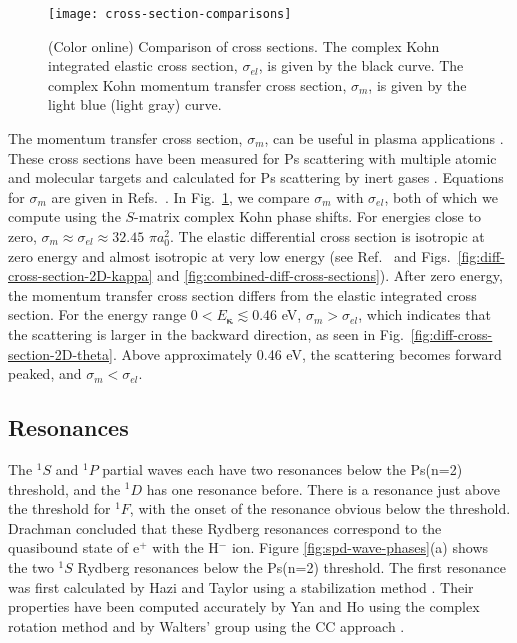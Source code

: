 \documentclass[preprint,showpacs,showkeys,preprintnumbers,amsmath,amssymb,longbibliography,pra,aps]{revtex4-1}
\begin{document}
\begin{figure}[H]
	\centering
	\texttt{[image: cross-section-comparisons]}
	\caption{(Color online) Comparison of cross sections. The complex Kohn integrated
elastic cross section, $\sigma_{el}$, is given by the black curve. The complex
Kohn momentum transfer cross section, $\sigma_m$, is given by the
light blue (light gray) curve.} %
	\label{fig:cross-section-comparisons}
\end{figure}

The momentum transfer cross section, $\sigma_m$, can be useful in plasma applications
\cite{Wang2014, McEachran2014}. These cross sections have been measured for Ps
scattering with multiple atomic and molecular targets
\cite{Nagashima1998,Saito2003,Skalsey1998} and calculated
for Ps scattering by inert gases \cite{Blackwood2002c}. 
Equations for $\sigma_m$ are given
in Refs.~\cite{Bransden2003,Massey1969}.
In Fig.~\ref{fig:cross-section-comparisons}, we compare $\sigma_m$ with
$\sigma_{el}$, both of which we compute using the $S$-matrix complex Kohn phase shifts.
For energies close to zero,
$\sigma_m \approx \sigma_{el} \approx 32.45$ $\pi a_0^2$.
The elastic differential cross section is isotropic at zero energy and
almost isotropic at very low energy (see Ref.~\cite{Blackwood2002c} and
Figs.~\ref{fig:diff-cross-section-2D-kappa} and \ref{fig:combined-diff-cross-sections}).
After zero energy, the momentum transfer cross section differs from the
elastic integrated cross section. For the energy range
$0 < E_{\bm \kappa} \lesssim 0.46$ eV, $\sigma_m > \sigma_{el}$,
which indicates that the scattering is larger in the backward 
direction, as seen in Fig.~\ref{fig:diff-cross-section-2D-theta}.
Above approximately 0.46 eV, the scattering
becomes forward peaked, and $\sigma_m < \sigma_{el}$. %


\subsection{Resonances}
\label{sec:Resonances}

The $^1S$ and $^1P$ partial waves each have two resonances below the Ps(n=2) 
threshold, and the $^1D$ has one resonance before. There is a resonance just 
above the threshold for $^1F$, with the onset of the resonance obvious below the 
threshold. Drachman \cite{Drachman1979} concluded that these Rydberg 
resonances correspond to the quasibound state of e$^+$ with the H$^-$ ion.
Figure \ref{fig:spd-wave-phases}(a) shows the 
two $^1S$ Rydberg resonances below the Ps(n=2) threshold. The first resonance 
 was first 
calculated by Hazi and Taylor using a stabilization method \cite{Hazi1970}. 
Their properties have been computed accurately by Yan and Ho using the complex 
rotation method \cite{Yan1999} and by Walters' group using the CC 
approach \cite{Walters2004}.
\end{document}
